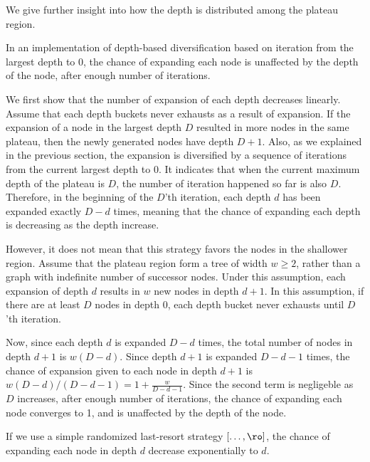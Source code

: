 We give further insight into how the depth is distributed among the
plateau region.

\begin{theo}
 In an implementation of depth-based diversification based on iteration
 from the largest depth to 0, the chance of expanding each node is
 unaffected by the depth of the node, after enough number of iterations.
\end{theo}

We first show that the number of expansion of each depth decreases
linearly.  Assume that each depth buckets never exhausts as a result of
expansion.  If the expansion of a node in the largest depth $D$ resulted
in more nodes in the same plateau, then the newly generated nodes have
depth $D+1$.  Also, as we explained in the previous section, the
expansion is diversified by a sequence of iterations from the current
largest depth to 0.  It indicates that when the current maximum depth of
the plateau is $D$, the number of iteration happened so far is also $D$.
Therefore, in the beginning of the $D$'th iteration, each depth $d$ has
 been expanded exactly $D-d$ times, meaning that the chance of
expanding each depth is decreasing as the depth increase.

However, it does not mean that this strategy favors the nodes in the
shallower region.
 Assume that the plateau region form a tree of width
$w\geq 2$, rather than a graph with indefinite number of successor
nodes.  Under this assumption, each expansion of depth $d$ results in
$w$ new nodes in depth $d+1$. In this assumption, if there are at least
$D$ nodes in depth 0, each depth bucket never exhausts until $D$'th
iteration.

Now, since each depth $d$ is expanded $D-d$ times, the total
number of nodes in depth $d+1$ is $w(D-d)$. Since depth $d+1$ is
expanded $D-d-1$ times, the chance of expansion given to each node in
depth $d+1$ is $w(D-d)/(D-d-1)=1+\frac{w}{D-d-1}$. Since the second term is
negligeble as $D$ increases, after enough number of iterations, the
chance of expanding each node converges to 1, and is unaffected by the depth of the node.


\begin{theo}
 If we use a simple randomized last-resort strategy $[\ldots,\ro]$, the chance of expanding each
 node in depth $d$ decrease exponentially to $d$.
\end{theo}

